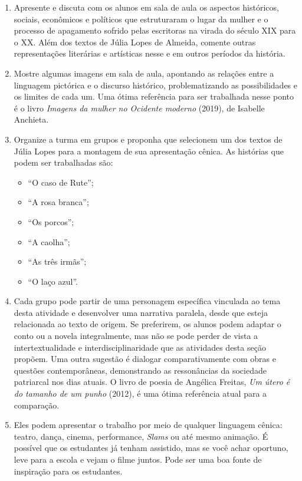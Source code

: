 \documentclass[12pt]{extarticle}
\begin{document}
\begin{enumerate}
\item
Apresente e discuta com os alunos em sala de
aula os aspectos históricos, sociais, econômicos e políticos que
estruturaram o lugar da mulher e o processo de apagamento sofrido pelas
escritoras na virada do século XIX para o XX. Além dos textos de Júlia
Lopes de Almeida, comente outras representações literárias e artísticas
nesse e em outros períodos da história.

\item
Mostre algumas imagens em sala de aula, apontando as relações entre a
linguagem pictórica e o discurso histórico, problematizando as
possibilidades e os limites de cada um. Uma ótima referência para ser
trabalhada nesse ponto é o livro \emph{Imagens da mulher no Ocidente
moderno} (2019), de Isabelle Anchieta.

\item
Organize a turma em grupos e proponha que selecionem um dos textos de
Júlia Lopes para a montagem de sua apresentação cênica. As histórias que
podem ser trabalhadas são:

\begin{itemize}
\item
  ``O caso de Rute'';
\item
  ``A rosa branca'';
\item
  ``Os porcos'';
\item
  ``A caolha'';
\item
  ``As três irmãs'';
\item
  ``O laço azul''.
\end{itemize}

\item
Cada grupo pode partir de uma personagem específica vinculada ao tema
desta atividade e desenvolver uma narrativa paralela, desde que esteja
relacionada ao texto de origem. Se preferirem, os alunos podem adaptar o
conto ou a novela integralmente, mas não se pode perder de vista a
intertextualidade e interdisciplinaridade que as atividades desta seção
propõem. Uma outra sugestão é dialogar comparativamente com obras e
questões contemporâneas, demonstrando as ressonâncias da sociedade
patriarcal nos dias atuais. O livro de poesia de Angélica Freitas,
\emph{Um útero é do tamanho de um punho} (2012), é uma ótima referência
atual para a comparação.

\item
Eles podem apresentar o trabalho por meio de qualquer linguagem
cênica: teatro, dança, cinema, performance, \emph{Slams} ou até mesmo
animação. É possível que os estudantes já tenham assistido, mas se você
achar oportuno, leve para a escola e vejam o filme juntos. Pode ser uma
boa fonte de inspiração para os estudantes.


\end{enumerate}
\end{document}
